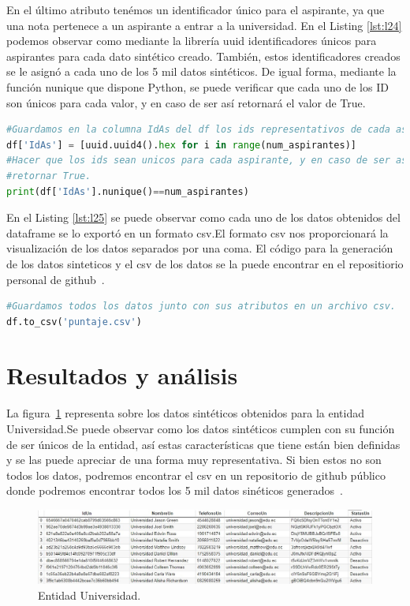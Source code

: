 \documentclass[10pt, oneside,spanish]{article}   	%
\begin{document}
En el último atributo tenémos un identificador único para el aspirante, ya que una nota pertenece a un aspirante a entrar a la universidad. En el Listing \ref{lst:l24} podemos observar como mediante la librería uuid identificadores únicos para aspirantes para cada dato sintético creado. También, estos identificadores creados se le asignó a cada uno de los 5 mil datos sintéticos. De igual forma, mediante la función nunique que dispone Python, se puede verificar que cada uno de los ID son únicos para cada valor, y en caso de ser así retornará el valor de True.
\begin{lstlisting}[language=Python,label={lst:l24},caption=Atributo IdAs para la variable puntaje,frame=single, ]
#Guardamos en la columna IdAs del df los ids representativos de cada aspirante.
df['IdAs'] = [uuid.uuid4().hex for i in range(num_aspirantes)]
#Hacer que los ids sean unicos para cada aspirante, y en caso de ser así 
#retornar True.
print(df['IdAs'].nunique()==num_aspirantes)
\end{lstlisting}
En el Listing \ref{lst:l25} se puede observar como cada uno de los datos obtenidos del dataframe se lo exportó en un formato csv.El formato csv nos proporcionará la visualización de los datos separados por una coma. El código para la generación de los datos sinteticos y el csv de los datos se la puede encontrar en el repositiorio personal de github~\cite{puntaje,puntajecsv}.
\begin{lstlisting}[language=Python,label={lst:l25},caption=Exportación de los datos a un formato csv de la entidad Puntaje,frame=single, ]
#Guardamos todos los datos junto con sus atributos en un archivo csv.
df.to_csv('puntaje.csv')
\end{lstlisting}
\section{Resultados y análisis}
 La figura~\ref{fig1} representa sobre los datos sintéticos obtenidos para la entidad Universidad.Se puede observar como los datos sintéticos cumplen con su función de ser únicos de la entidad, así estas características que tiene están bien definidas y se las puede apreciar de una forma muy representativa. Si bien estos no son todos los datos, podremos encontrar el csv en un repositorio de github público donde podremos encontrar todos los 5 mil datos sinéticos generados~\cite{universidad,universidadcsv}.

\begin{figure}[H] 
        \centering \includegraphics[width=1\columnwidth]{TablaUniversidad.jpg}
        \caption{\label{fig1}Entidad Universidad.
        }
\end{figure}
\end{document}
